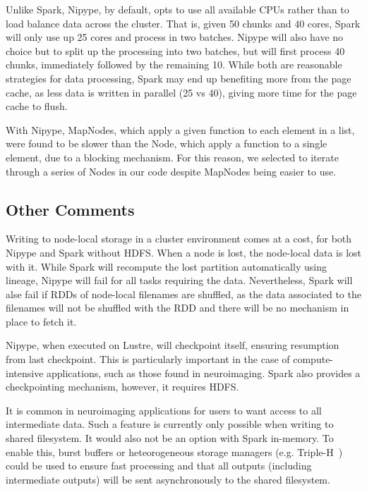 \documentclass{IEEEtran}
\newcommand{\todo}[1]{\marginpar{\parbox{18mm}{\flushleft\tiny\color{red}\textbf{TODO}:
      #1}}}
\begin{document}
Unlike Spark, Nipype, by default, opts to use all available CPUs rather 
than to load balance data across the cluster. That is, given 50 chunks 
and 40 cores, Spark will only use up 25 cores and process in two batches.
Nipype will also have no choice 
but to split up the processing into two batches, but will first process 
40 chunks, immediately followed by the remaining 10. While both are 
reasonable strategies for data processing, Spark may end up benefiting 
more from the page cache, as less data is written in parallel (25 vs 
40), giving more time for the page cache to flush.

With Nipype, MapNodes, which apply a given function to each element in 
a list, were found to be slower than the Node, which apply a function 
to a single element, due to a blocking mechanism. For this reason, we 
selected to iterate through a series of Nodes in our code despite MapNodes being
easier to use.


\subsection{Other Comments}

Writing to node-local storage in a cluster environment comes at a cost, for both
Nipype and Spark without HDFS. When a node is lost, the node-local data is lost
with it. While Spark will recompute the lost partition automatically using lineage, 
Nipype will fail for all tasks requiring the data. Nevertheless, Spark will alse fail if 
RDDs of node-local filenames are shuffled, as the data associated to the filenames
will not be shuffled with the RDD and there will be no mechanism in place to fetch it.

Nipype, when executed on Lustre, will checkpoint itself, ensuring resumption from
last checkpoint. This is particularly important in the case of compute-intensive 
applications, such as those found in neuroimaging. Spark also provides a checkpointing
mechanism, however, it requires HDFS.

It is common in neuroimaging applications for users to want access to all intermediate
data. Such a feature is currently only possible when writing to shared filesystem. 
It would also not be an option with Spark in-memory. To enable this, burst buffers or 
heteorogeneous storage managers (e.g. Triple-H~\cite{islam2015triple}) could be used to ensure
fast processing and that all outputs (including intermediate outputs) will be 
sent asynchronously to the shared filesystem.
\end{document}
